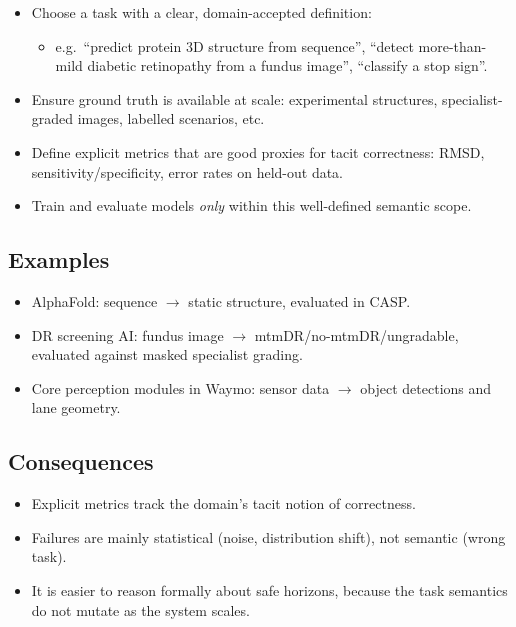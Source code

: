 \begin{itemize}
  \item Choose a task with a clear, domain-accepted definition:
        \begin{itemize}
          \item e.g.\ ``predict protein 3D structure from sequence'',
                ``detect more-than-mild diabetic retinopathy from a
                fundus image'', ``classify a stop sign''.
        \end{itemize}
  \item Ensure ground truth is available at scale:
        experimental structures, specialist-graded images, labelled
        scenarios, etc.
  \item Define explicit metrics that are good proxies for tacit
        correctness:
        RMSD, sensitivity/specificity, error rates on held-out data.
  \item Train and evaluate models \emph{only} within this well-defined
        semantic scope.
\end{itemize}

\subsection*{Examples}

\begin{itemize}
  \item AlphaFold:
        sequence $\to$ static structure, evaluated in CASP.
  \item DR screening AI:
        fundus image $\to$ mtmDR/no-mtmDR/ungradable, evaluated
        against masked specialist grading.
  \item Core perception modules in Waymo:
        sensor data $\to$ object detections and lane geometry.
\end{itemize}

\subsection*{Consequences}

\begin{itemize}
  \item Explicit metrics track the domain’s tacit notion of correctness.
  \item Failures are mainly statistical (noise, distribution shift),
        not semantic (wrong task).
  \item It is easier to reason formally about safe horizons, because
        the task semantics do not mutate as the system scales.
\end{itemize}

